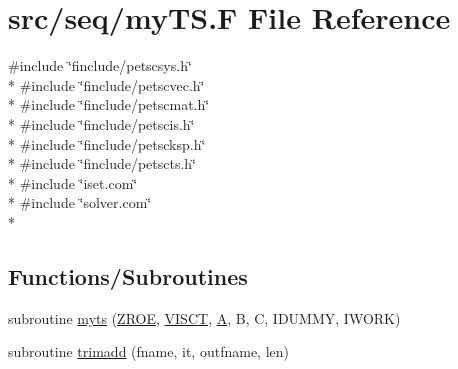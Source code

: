\hypertarget{seq_2my_t_s_8_f}{\section{src/seq/my\-T\-S.F File Reference}
\label{seq_2my_t_s_8_f}
}
{\ttfamily \#include \char`\"{}finclude/petscsys.\-h\char`\"{}}\\*
{\ttfamily \#include \char`\"{}finclude/petscvec.\-h\char`\"{}}\\*
{\ttfamily \#include \char`\"{}finclude/petscmat.\-h\char`\"{}}\\*
{\ttfamily \#include \char`\"{}finclude/petscis.\-h\char`\"{}}\\*
{\ttfamily \#include \char`\"{}finclude/petscksp.\-h\char`\"{}}\\*
{\ttfamily \#include \char`\"{}finclude/petscts.\-h\char`\"{}}\\*
{\ttfamily \#include \char`\"{}iset.\-com\char`\"{}}\\*
{\ttfamily \#include \char`\"{}solver.\-com\char`\"{}}\\*
\subsection*{Functions/\-Subroutines}
\begin{DoxyCompactItemize}
\item 
subroutine \hyperlink{seq_2my_t_s_8_f_a4cade51e0688fec0f195914719d9cb3d}{myts} (\hyperlink{myts_8com_a0c4fbcdb78e6b50c8919d714e4b5a694}{Z\-R\-O\-E}, \hyperlink{myts_8com_accf7addb2159476a2ff0ba7d99b8bbbc}{V\-I\-S\-C\-T}, \hyperlink{ibc2_8com_ad2108d58343608772fff791c23da58f5}{A}, B, C, I\-D\-U\-M\-M\-Y, I\-W\-O\-R\-K)
\item 
subroutine \hyperlink{seq_2my_t_s_8_f_a8dffd0883a3b978d39b4f4154a9584a3}{trimadd} (fname, it, outfname, len)
\end{DoxyCompactItemize}


